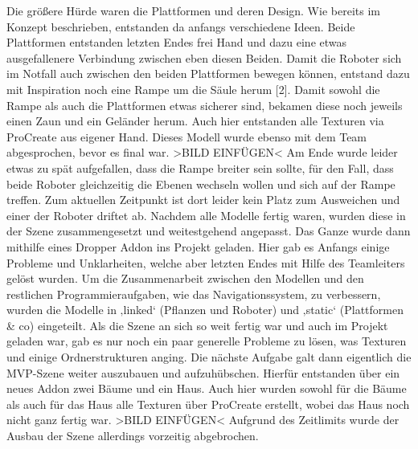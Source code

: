 Die größere Hürde waren die Plattformen und deren Design. Wie bereits im Konzept beschrieben, entstanden da anfangs verschiedene Ideen. Beide Plattformen entstanden letzten Endes frei Hand und dazu eine etwas ausgefallenere Verbindung zwischen eben diesen Beiden. Damit die Roboter sich im Notfall auch zwischen den beiden Plattformen bewegen können, entstand dazu mit Inspiration noch eine Rampe um die Säule herum [2]. Damit sowohl die Rampe als auch die Plattformen etwas sicherer sind, bekamen diese noch jeweils einen Zaun und ein Geländer herum. Auch hier entstanden alle Texturen via ProCreate aus eigener Hand. Dieses Modell wurde ebenso mit dem Team abgesprochen, bevor es final war. >BILD EINFÜGEN< Am Ende wurde leider etwas zu spät aufgefallen, dass die Rampe breiter sein sollte, für den Fall, dass beide Roboter gleichzeitig die Ebenen wechseln wollen und sich auf der Rampe treffen. Zum aktuellen Zeitpunkt ist dort leider kein Platz zum Ausweichen und einer der Roboter driftet ab.
Nachdem alle Modelle fertig waren, wurden diese in der Szene zusammengesetzt und weitestgehend angepasst. Das Ganze wurde dann mithilfe eines Dropper Addon ins Projekt geladen. Hier gab es Anfangs einige Probleme und Unklarheiten, welche aber letzten Endes mit Hilfe des Teamleiters gelöst wurden. Um die Zusammenarbeit zwischen den Modellen und den restlichen Programmieraufgaben, wie das Navigationssystem, zu verbessern, wurden die Modelle in ‚linked‘ (Pflanzen und Roboter) und ‚static‘ (Plattformen & co) eingeteilt.
Als die Szene an sich so weit fertig war und auch im Projekt geladen war, gab es nur noch ein paar generelle Probleme zu lösen, was Texturen und einige Ordnerstrukturen anging.
Die nächste Aufgabe galt dann eigentlich die MVP-Szene weiter auszubauen und aufzuhübschen. Hierfür entstanden über ein neues Addon zwei Bäume und ein Haus. Auch hier wurden sowohl für die Bäume als auch für das Haus alle Texturen über ProCreate erstellt, wobei das Haus noch nicht ganz fertig war. >BILD EINFÜGEN< Aufgrund des Zeitlimits wurde der Ausbau der Szene allerdings vorzeitig abgebrochen.
